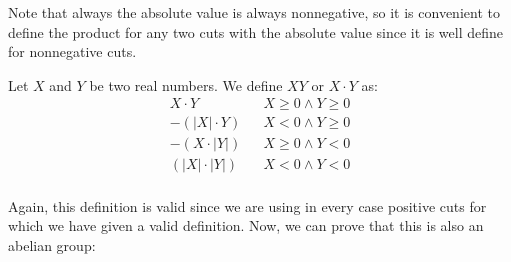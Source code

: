 \documentclass{tufte-handout}
\begin{document}
Note that always the absolute value is always nonnegative, so it is convenient to define the product for any two cuts with the absolute value since it is well define for nonnegative cuts.

\begin{definition}
	Let $X$ and $Y$ be two real numbers. We define $XY$ or $X \cdot Y$ as:
	\begin{align*}
		X \cdot Y && X \ge 0 \wedge Y \ge 0\\
		-(|X| \cdot Y) && X < 0 \wedge Y \ge 0\\
		-(X \cdot |Y|) && X \ge 0 \wedge Y < 0\\
		(|X| \cdot |Y|) && X < 0 \wedge Y < 0\\
	\end{align*}
\end{definition}

Again, this definition is valid since we are using in every case positive cuts for which we have given a valid definition. Now, we can prove that this is also an abelian group:
\end{document}
